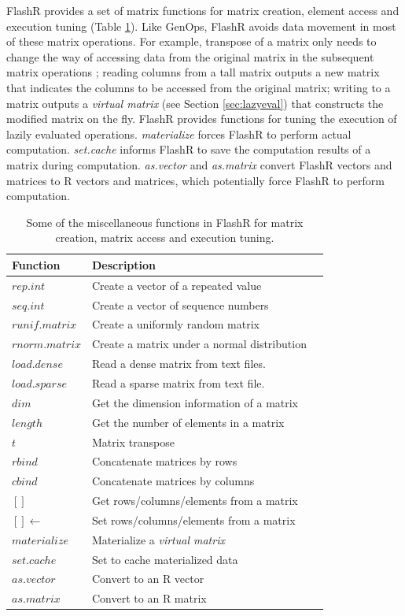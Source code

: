 FlashR provides a set of matrix functions for matrix creation, element access
and execution tuning (Table \ref{tbl:utility}). Like GenOps, FlashR avoids
data movement in most of these matrix operations. For example, transpose
of a matrix only needs to change the way of accessing data from the original
matrix in the subsequent
matrix operations \cite{Guibas78}; reading columns from a tall matrix outputs
a new matrix that indicates the columns to be accessed from the original matrix;
writing to a matrix outputs a \textit{virtual matrix} (see Section
\ref{sec:lazyeval}) that constructs the modified matrix on the fly.
FlashR provides functions for tuning the execution of lazily evaluated operations.
\textit{materialize} forces FlashR to perform actual computation.
\textit{set.cache} informs FlashR to save the computation results
of a matrix during computation. \textit{as.vector} and \textit{as.matrix}
convert FlashR vectors and matrices to R vectors and matrices, which potentially
force FlashR to perform computation.

\begin{table}
\begin{center}
\caption{Some of the miscellaneous functions in FlashR for matrix creation,
	matrix access and execution tuning.}
\vspace{-10pt}
\footnotesize
\begin{tabular}{|l|l|l|}
\hline
Function & Description \\
\hline
$rep.int$ & Create a vector of a repeated value \\
$seq.int$ & Create a vector of sequence numbers \\
$runif.matrix$ & Create a uniformly random matrix  \\
$rnorm.matrix$ & Create a matrix under a normal distribution \\
\hline
$load.dense$ & Read a dense matrix from text files. \\
$load.sparse$ & Read a sparse matrix from text file. \\
\hline
$dim$ & Get the dimension information of a matrix\\
$length$ & Get the number of elements in a matrix\\
\hline
$t$ & Matrix transpose \\
$rbind$ & Concatenate matrices by rows \\
$cbind$ & Concatenate matrices by columns \\
$[]$ & Get rows/columns/elements from a matrix \\
$[]\gets$ & Set rows/columns/elements from a matrix \\
\hline
$materialize$ & Materialize a \textit{virtual matrix} \\
$set.cache$ & Set to cache materialized data \\
$as.vector$ & Convert to an R vector \\
$as.matrix$ & Convert to an R matrix \\
\hline
\end{tabular}
\normalsize
\label{tbl:utility}
\end{center}
\end{table}

